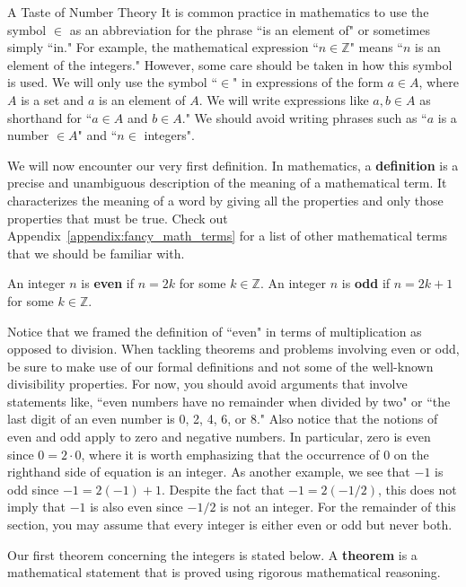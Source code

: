 \begin{section}{A Taste of Number Theory}
It is common practice in mathematics to use the symbol $\boxed{\in}$ as an abbreviation for the phrase ``is an element of" or sometimes simply ``in."  For example, the mathematical expression ``$n\in\mathbb{Z}$" means ``$n$ is an element of the integers."  However, some care should be taken in how this symbol is used. We will only use the symbol ``$\in$" in expressions of the form $\boxed{a \in A}$, where $A$ is a set and $a$ is an element of $A$.  We will write  expressions like $\boxed{a,b\in A}$  as shorthand for ``$a\in A$ and $b\in A$." We should avoid writing phrases such as ``$a$ is a number $\in A$" and ``$n \in$ integers".

We will now encounter our very first definition.  In mathematics, a \textbf{definition} is a precise and unambiguous description of the meaning of a mathematical term.  It characterizes the meaning of a word by giving all the properties and only those properties that must be true.  Check out Appendix~\ref{appendix:fancy_math_terms} for a list of other mathematical terms that we should be familiar with.

\begin{definition}
An integer $n$ is \textbf{even} if $n=2k$ for some $k\in\mathbb{Z}$. An integer $n$ is \textbf{odd} if $n=2k+1$ for some $k\in\mathbb{Z}$.
\end{definition}

Notice that we framed the definition of ``even" in terms of multiplication as opposed to division. When tackling theorems and problems involving even or odd, be sure to make use of our formal definitions and not some of the well-known divisibility properties.  For now, you should avoid arguments that involve statements like, ``even numbers have no remainder when divided by two" or ``the last digit of an even number is 0, 2, 4, 6, or 8." Also notice that the notions of even and odd apply to zero and negative numbers.  In particular, zero is even since $0=2\cdot 0$, where it is worth emphasizing that the occurrence of $0$ on the righthand side of equation is an integer.  As another example, we see that $-1$ is odd since $-1=2(-1)+1$.  Despite the fact that $-1=2(-1/2)$, this does not imply that $-1$ is also even since $-1/2$ is not an integer. For the remainder of this section, you may assume that every integer is either even or odd but never both. %

Our first theorem concerning the integers is stated below.  A \textbf{theorem} is a mathematical statement that is proved using rigorous mathematical reasoning. 


\end{section}
